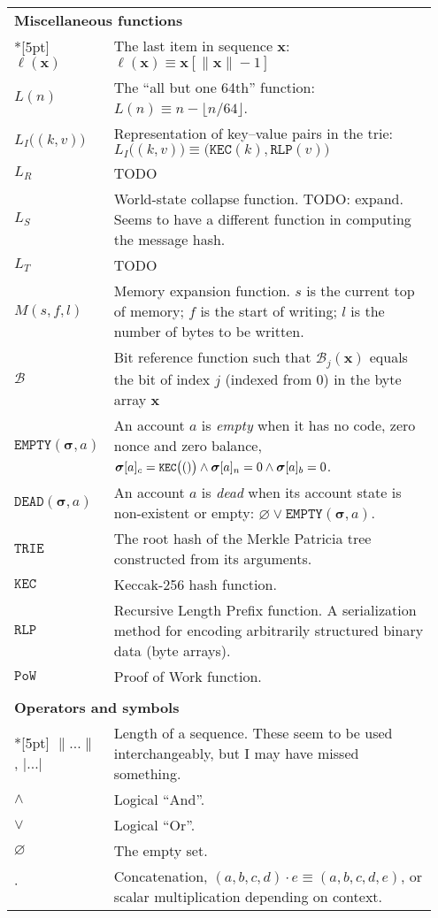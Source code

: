 \documentclass[9pt,oneside]{amsart}
\begin{document}
\begin{longtable}{p{0.10\linewidth}p{0.85\linewidth}}
\vspace{5pt} \\
\midrule
\multicolumn{2}{l}{\textbf{Miscellaneous functions}} \\*[5pt]
$\ell(\mathbf{x})$ & The last item in sequence $\mathbf{x}$: $\ell(\mathbf{x}) \equiv \mathbf{x}[\lVert \mathbf{x} \rVert - 1]$ \\
$L(n)$ & The ``all but one 64th'' function: $L(n) \equiv n - \lfloor n / 64 \rfloor$.\\
$L_I\big( (k, v) \big)$ & Representation of key--value pairs in the trie: $L_I\big( (k, v) \big) \equiv \big(\texttt{KEC}(k), \texttt{RLP}(v)\big)$ \\
$L_R$ & TODO \\
$L_S$ & World-state collapse function. TODO: expand. Seems to have a different function in computing the message hash.\\
$L_T$ & TODO \\
$M(s, f, l)$ & Memory expansion function. $s$ is the current top of memory; $f$ is the start of writing; $l$ is the number of bytes to be written. \\
$\mathcal{B}$ & Bit reference function such that $\mathcal{B}_j(\mathbf{x})$ equals the bit of index $j$ (indexed from 0) in the byte array $\mathbf{x}$ \\
$\mathtt{EMPTY}(\boldsymbol{\sigma}, a)$ & An account $a$ is \textit{empty} when it has no code, zero nonce and zero balance, $\boldsymbol{\sigma}[a]_c = \texttt{\small KEC}\big(()\big) \wedge \boldsymbol{\sigma}[a]_n = 0 \wedge \boldsymbol{\sigma}[a]_b = 0$. \\
$\mathtt{DEAD}(\boldsymbol{\sigma}, a)$ & An account $a$ is \textit{dead} when its account state is non-existent or empty: $\varnothing \vee \mathtt{EMPTY}(\boldsymbol{\sigma}, a)$. \\
$\mathtt{TRIE}$ & The root hash of the Merkle Patricia tree constructed from its arguments. \\
$\mathtt{KEC}$ & Keccak-256 hash function. \\
$\mathtt{RLP}$ & Recursive Length Prefix function. A serialization method for encoding arbitrarily structured binary data (byte arrays). \\
$\mathtt{PoW}$ & Proof of Work function. \\

\vspace{5pt} \\
\midrule
\multicolumn{2}{l}{\textbf{Operators and symbols}} \\*[5pt]
$\lVert ... \rVert$, $| ... |$ & Length of a sequence. These seem to be used interchangeably, but I may have missed something. \\
$\wedge$ & Logical ``And''. \\
$\vee$ & Logical ``Or''. \\
$\varnothing$ & The empty set. \\
$\cdot$ & Concatenation, $(a, b, c, d) \cdot e \equiv (a, b, c, d, e)$, or scalar multiplication depending on context. \\


\end{longtable}
\end{document}
